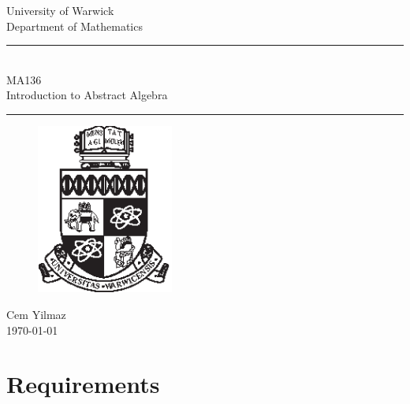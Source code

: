\documentclass[a4paper]{article}
\theoremstyle{plain}
\theoremstyle{definition}
\theoremstyle{remark}
\begin{document}
\begin{titlepage}
\begin{center}
\large
University of Warwick \\
Department of Mathematics \\
\huge
\vspace{50mm}
\rule{\linewidth}{0.5pt} \\
MA136 \\
\vspace{5mm}
\Large
Introduction to Abstract Algebra
\rule{\linewidth}{0.5pt}
\vspace{5mm}
\begin{figure}[H]
\centering
\includegraphics[width=0.4\textwidth]{crest_black.eps}
\end{figure}
\vspace{37mm}
Cem Yilmaz \\
\today
\end{center}
\end{titlepage}
\newpage
\tableofcontents
\newpage
\section{Requirements}
\end{document}

